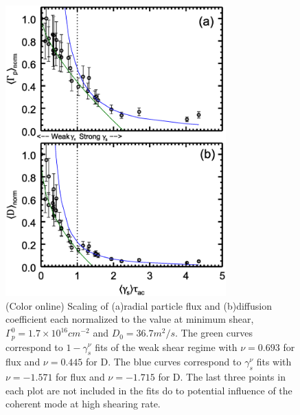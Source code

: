 \documentclass[aip,pop,amsmath,amssymb,peprint,superscriptaddress]{revtex4-1} %
\begin{document}
\begin{figure}[!htbp]
\centerline{
\includegraphics[width=8.5cm]{figure6.eps}}
\caption{\label{fig:fluxandD} (Color online) Scaling of (a)radial particle flux and (b)diffusion coefficient each normalized to the value at minimum shear, $\Gamma_{p}^{0} = 1.7\times10^{16} cm^{-2}$ and $D_{0} = 36.7 m^{2}/s$. The green curves correspond to $1-\gamma_{s}^{\nu}$ fits of the weak shear regime with $\nu = 0.693$ for flux and $\nu = 0.445$ for D. The blue curves correspond to $\gamma_{s}^{\nu}$ fits with $\nu = -1.571$ for flux and $\nu = -1.715$ for D. The last three points in each plot are not included in the fits do to potential influence of the coherent mode at high shearing rate.}
\end{figure}
\end{document}
